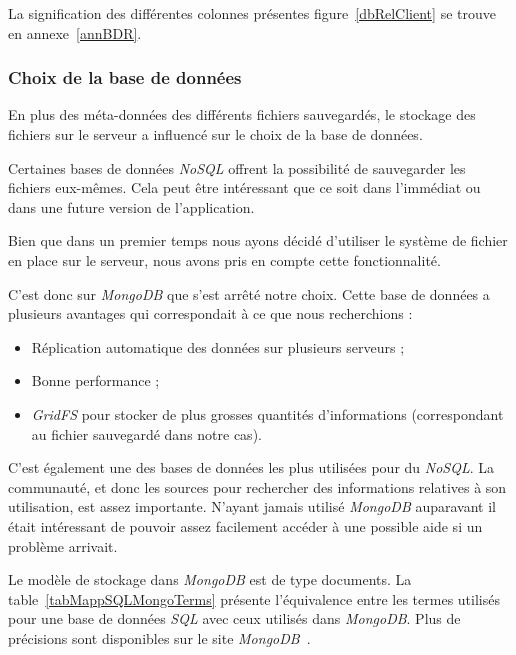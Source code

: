 \documentclass[a4paper,10pt, twoside]{report}
\begin{document}
\begin{spacing}{1.2}
La signification des différentes colonnes présentes figure~\ref{dbRelClient}
se trouve en annexe~\ref{annBDR}.

\subsubsection{Choix de la base de données}

En plus des méta-données des différents fichiers sauvegardés, le
stockage des fichiers sur le serveur a influencé sur le choix de la base de
données. 

Certaines bases de données \textit{NoSQL} offrent la possibilité de 
sauvegarder les fichiers eux-mêmes. Cela peut être intéressant que ce
soit dans l'immédiat ou dans une future version de l'application.

Bien que dans un premier temps nous ayons décidé d'utiliser le
système de fichier en place sur le serveur, nous avons pris en compte cette
fonctionnalité.

C'est donc sur \textit{MongoDB} que s'est arrêté notre choix. Cette base
de données a plusieurs avantages qui correspondait à ce que nous
recherchions :

\begin{itemize}
 \item Réplication automatique des données sur plusieurs serveurs ;
 \item Bonne performance ;
 \item \textit{GridFS} pour stocker de plus grosses quantités d'informations
 (correspondant au fichier sauvegardé dans notre cas).
\end{itemize}

C'est également une des bases de données les plus utilisées pour du
\textit{NoSQL}. La communauté, et donc les sources pour rechercher des
informations relatives à son utilisation, est assez importante. N'ayant
jamais utilisé \textit{MongoDB} auparavant il était intéressant
de pouvoir assez facilement accéder à une
possible aide si un problème arrivait.

Le modèle de stockage dans \textit{MongoDB} est de type documents. La
table~\ref{tabMappSQLMongoTerms} présente l'équivalence entre les termes
utilisés pour une base de données \textit{SQL} avec ceux utilisés dans
\textit{MongoDB}. Plus de précisions sont disponibles sur le site
\textit{MongoDB}~\cite{refMappingSQLMDB}.


\end{spacing}
\end{document}
